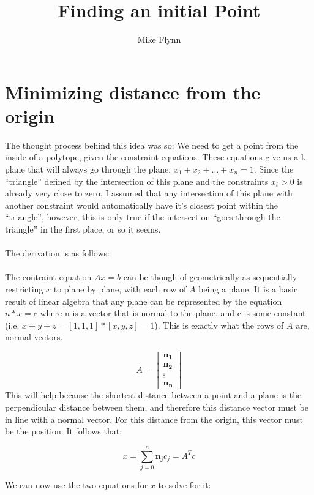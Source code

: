 \documentclass{article}\usepackage{graphicx, color}
\begin{document}
\title{Finding an initial Point}

\author{Mike Flynn}
\maketitle
\section*{Minimizing distance from the origin}

The thought process behind this idea was so: We need to get a point
from the inside of a polytope, given the constraint equations. These
equations give us a k-plane that will always go through the plane:
$x_1 + x_2 + \dots + x_n = 1$. Since the ``triangle'' defined by the
intersection of this plane and the constraints $x_i > 0$ is already
very close to zero, I assumed that any intersection of this plane with
another constraint would automatically have it's closest point within
the ``triangle'', however, this is only true if the intersection
``goes through the triangle'' in the first place, or so it seems.
\\ \\
\noindent The derivation is as follows:
\\ \\
\noindent The contraint equation $Ax=b$ can be though of geometrically
as sequentially restricting $x$ to plane by plane, with each row of
$A$ being a plane. It is a basic result of linear algebra that any
plane can be represented by the equation $ n * x = c$ where n is a
vector that is normal to the plane, and c is some constant
(i.e. $x+y+z = [1,1,1] * [x,y,z] = 1$). This is exactly what the rows
of $A$ are, normal vectors.

$$ A = \begin{bmatrix}\mathbf{n_1} \\\mathbf{n_2} \\ \vdots \\ \mathbf{n_n} \end{bmatrix} $$
\noindent
This will help because the shortest distance between a point and a
plane is the perpendicular distance between them, and therefore this
distance vector must be in line with a normal vector. For this
distance from the origin, this vector must be the position. It follows
that:

$$ x = \sum_{j=0}^n \mathbf{n_j}c_j = A^T c$$

\noindent
We can now use the two equations for $x$ to solve for it:
\end{document}
